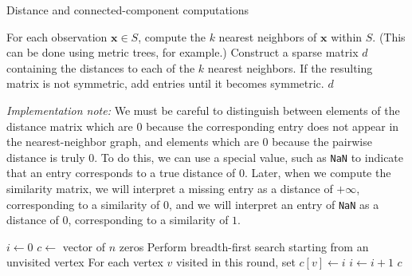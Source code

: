 \documentclass[11pt]{article}
\begin{document}
\begin{algorithm}
\caption{Distance and connected-component computations}
\begin{algorithmic}
  \State For each observation $\mathbf x \in S$, compute the $k$ nearest neighbors of $\mathbf x$ within $S$.
  \State (This can be done using metric trees, for example.)
  \State Construct a sparse matrix $d$ containing the distances to each of the $k$ nearest neighbors.
  \State If the resulting matrix is not symmetric, add entries until it becomes symmetric.
  \State \Return $d$
\EndFunction

\vspace{1em}
\noindent
\emph{Implementation note:} We must be careful to distinguish between elements of the distance matrix which are $0$ because the corresponding entry does not appear in the nearest-neighbor graph, and elements which are $0$ because the pairwise distance is truly $0$.
To do this, we can use a special value, such as \texttt{NaN} to indicate that an entry corresponds to a true distance of $0$.
Later, when we compute the similarity matrix, we will interpret a missing entry as a distance of $+\infty$, corresponding to a similarity of $0$, and we will interpret an entry of \texttt{NaN} as a distance of $0$, corresponding to a similarity of $1$.

\vspace{1em}
  \State $i \gets 0$
  \State $c \gets$ vector of $n$ zeros
    \State Perform breadth-first search starting from an unvisited vertex
    \State For each vertex $v$ visited in this round, set $c[v] \gets i$
    \State $i \gets i + 1$
  \EndWhile
  \State \Return $c$
\EndFunction
\end{algorithmic}
\end{algorithm}
\end{document}
